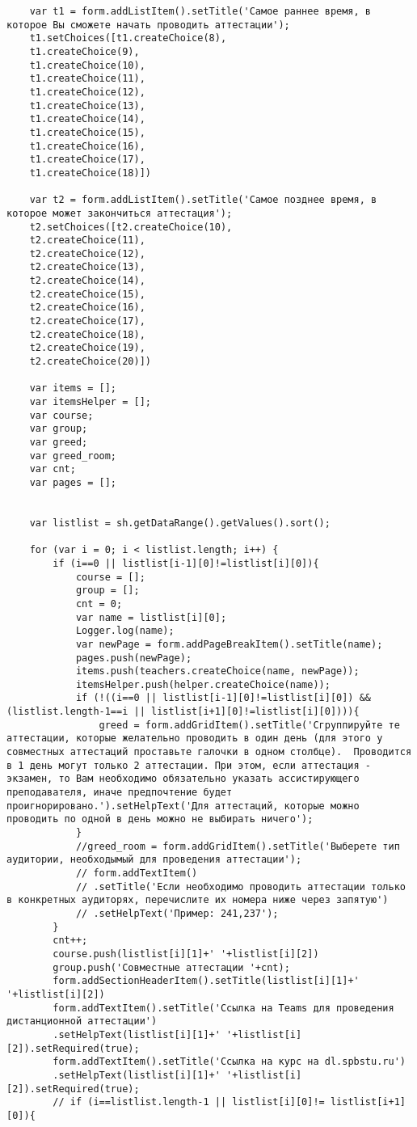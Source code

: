 \begin{lstlisting}
	var t1 = form.addListItem().setTitle('Самое раннее время, в которое Вы сможете начать проводить аттестации');
	t1.setChoices([t1.createChoice(8),
	t1.createChoice(9),
	t1.createChoice(10),
	t1.createChoice(11),
	t1.createChoice(12),
	t1.createChoice(13),
	t1.createChoice(14),
	t1.createChoice(15),
	t1.createChoice(16),
	t1.createChoice(17),
	t1.createChoice(18)])
	
	var t2 = form.addListItem().setTitle('Самое позднее время, в которое может закончиться аттестация');
	t2.setChoices([t2.createChoice(10),
	t2.createChoice(11),
	t2.createChoice(12),
	t2.createChoice(13),
	t2.createChoice(14),
	t2.createChoice(15),
	t2.createChoice(16),
	t2.createChoice(17),
	t2.createChoice(18),
	t2.createChoice(19),
	t2.createChoice(20)])
	
	var items = [];
	var itemsHelper = [];
	var course;
	var group;
	var greed;
	var greed_room;
	var cnt;
	var pages = [];
	
	
	var listlist = sh.getDataRange().getValues().sort();
	
	for (var i = 0; i < listlist.length; i++) {
		if (i==0 || listlist[i-1][0]!=listlist[i][0]){
			course = [];
			group = [];
			cnt = 0;
			var name = listlist[i][0];
			Logger.log(name);
			var newPage = form.addPageBreakItem().setTitle(name);
			pages.push(newPage);
			items.push(teachers.createChoice(name, newPage));
			itemsHelper.push(helper.createChoice(name));
			if (!((i==0 || listlist[i-1][0]!=listlist[i][0]) && (listlist.length-1==i || listlist[i+1][0]!=listlist[i][0]))){
				greed = form.addGridItem().setTitle('Сгруппируйте те аттестации, которые желательно проводить в один день (для этого у совместных аттестаций проставьте галочки в одном столбце).  Проводится в 1 день могут только 2 аттестации. При этом, если аттестация - экзамен, то Вам необходимо обязательно указать ассистирующего преподавателя, иначе предпочтение будет проигнорировано.').setHelpText('Для аттестаций, которые можно проводить по одной в день можно не выбирать ничего');
			}
			//greed_room = form.addGridItem().setTitle('Выберете тип аудитории, необходымый для проведения аттестации');
			// form.addTextItem()
			// .setTitle('Если необходимо проводить аттестации только в конкретных аудиторях, перечислите их номера ниже через запятую')
			// .setHelpText('Пример: 241,237');
		}
		cnt++;
		course.push(listlist[i][1]+' '+listlist[i][2])
		group.push('Совместные аттестации '+cnt);
		form.addSectionHeaderItem().setTitle(listlist[i][1]+' '+listlist[i][2])
		form.addTextItem().setTitle('Ссылка на Teams для проведения дистанционной аттестации')
		.setHelpText(listlist[i][1]+' '+listlist[i][2]).setRequired(true);
		form.addTextItem().setTitle('Ссылка на курс на dl.spbstu.ru')
		.setHelpText(listlist[i][1]+' '+listlist[i][2]).setRequired(true);
		// if (i==listlist.length-1 || listlist[i][0]!= listlist[i+1][0]){
			

\end{lstlisting}
